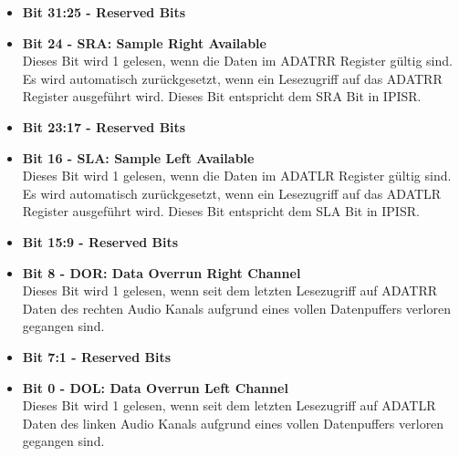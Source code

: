 \begin{itemize}
    \item \textbf{Bit 31:25 - Reserved Bits}
    \item \textbf{Bit 24 - SRA: Sample Right Available}\\
    Dieses Bit wird 1 gelesen, wenn die Daten im ADATRR Register gültig sind.
    Es wird automatisch zurückgesetzt, wenn ein Lesezugriff auf das ADATRR Register ausgeführt wird.
    Dieses Bit entspricht dem SRA Bit in IPISR.
    \item \textbf{Bit 23:17 - Reserved Bits}
    \item \textbf{Bit 16 - SLA: Sample Left Available}\\
    Dieses Bit wird 1 gelesen, wenn die Daten im ADATLR Register gültig sind.
    Es wird automatisch zurückgesetzt, wenn ein Lesezugriff auf das ADATLR Register ausgeführt wird.
    Dieses Bit entspricht dem SLA Bit in IPISR.
    \item \textbf{Bit 15:9 - Reserved Bits}
    \item \textbf{Bit 8 - DOR: Data Overrun Right Channel}\\
    Dieses Bit wird 1 gelesen, wenn seit dem letzten Lesezugriff auf ADATRR Daten des rechten Audio Kanals aufgrund eines vollen Datenpuffers verloren gegangen sind.
    \item \textbf{Bit 7:1 - Reserved Bits}
    \item \textbf{Bit 0 - DOL: Data Overrun Left Channel}\\
    Dieses Bit wird 1 gelesen, wenn seit dem letzten Lesezugriff auf ADATLR Daten des linken Audio Kanals aufgrund eines vollen Datenpuffers verloren gegangen sind.
\end{itemize}